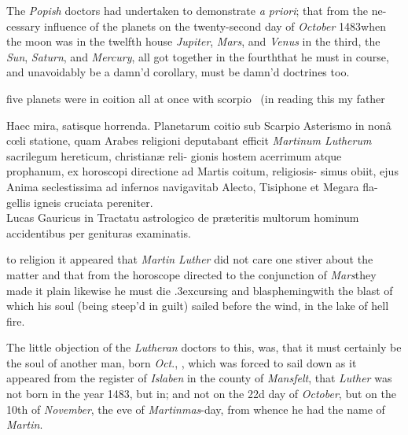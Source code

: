 \documentclass{article}
\begin{document}
The \textit{Popish} doctors had undertaken to demonstrate
\textit{a priori}; that from the ne- cessary influence of the
planets on the twenty-second day of \textit{October}
1483\tsh when the moon was in the twelfth house\break
\tsk \textit{Jupiter}, \textit{Mars}, and \textit{Venus} in the third,\break
the \textit{Sun}, \textit{Saturn}, and \textit{Mercury}, all got together
in the fourth\tsk that he must in course, and unavoidably
be a damn’d\break
{}
corollary, must be damn’d doctrines too.

five planets were in coition all at once
with scorpio \fnast\ (in reading this my father\break
{}
\vfill

\begingroup\footnotesize
\indent\fnast\enspace
Haec mira, satisque horrenda. Planetarum\break
coitio sub Scarpio Asterismo in nonâ cœli statione,\break
quam Arabes religioni deputabant efficit \textit{Martinum\break
Lutherum} sacrilegum hereticum, christianæ reli-\break
gionis hostem acerrimum atque prophanum, ex\break
horoscopi directione ad Martis coitum, religiosis-\break
simus obiit, ejus Anima seclestissima ad infernos\break
navigavit\tsk ab Alecto, Tisiphone et Megara fla-\break 
gellis igneis cruciata pereniter.\\
\hbox{}\quad\tsk Lucas Gauricus in Tractatu astrologico de\break
præteritis multorum hominum accidentibus per\break
genituras examinatis.\par\endgroup

\newpage\noindent
{}
to religion\tsk
it appeared that \textit{Martin Lu\-ther} did not care one stiver about the matter
\tsk and that from the horoscope directed to the conjunction of \textit{Mars}\tsk they
made it plain likewise he must die\break
\lower.3ex\hbox{c}\sic ursing and
blaspheming\tsk with the blast of
which his soul (being steep’d in guilt) sailed before the wind, in the lake of
\break
hell fire.

The little objection of the \textit{Lutheran}\break
doctors to this, was, that it must certainly be the
soul of another man, born \textit{Oct}., \quad{}, which was forced to sail down  as it
appeared from the register of \textit{Islaben} in the county of
\textit{Mansfelt}, that \textit{Luther}\break
was not born in the year 1483, but in; and not on the 22d day of \textit{October}, but on the
10th of \textit{November}, the eve of \textit{Martinmas}-day, from
whence he had the name of \textit{Martin}.
\end{document}

